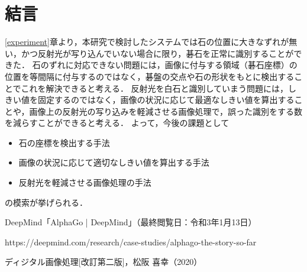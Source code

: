 \documentclass[summary]{nitocs}
\numberwithin{equation}{section}
\begin{document}
    \section{結言}\label{conclusion} %
        \ref{experiment}章より，本研究で検討したシステムでは石の位置に大きなずれが無い，かつ反射光が写り込んでいない場合に限り，碁石を正常に識別することができた．
        石のずれに対応できない問題には，画像に付与する領域（碁石座標）の位置を等間隔に付与するのではなく，碁盤の交点や石の形状をもとに検出することでこれを解決できると考える．
        反射光を白石と識別していまう問題には，しきい値を固定するのではなく，画像の状況に応じて最適なしきい値を算出することや，画像上の反射光の写り込みを軽減させる画像処理で，誤った識別をする数を減らすことができると考える．
        よって，今後の課題として
        \begin{itemize}
            \item 石の座標を検出する手法
            \item 画像の状況に応じて適切なしきい値を算出する手法
            \item 反射光を軽減させる画像処理の手法
        \end{itemize}
        の模索が挙げられる．    

    \begin{thebibliography}{10}
        DeepMind「AlphaGo | DeepMind」（最終閲覧日：令和3年1月13日）
        
        https://deepmind.com/research/case-studies/alphago-the-story-so-far

        ディジタル画像処理[改訂第二版]，松阪 喜幸（2020）
    \end{thebibliography}
\end{document}
